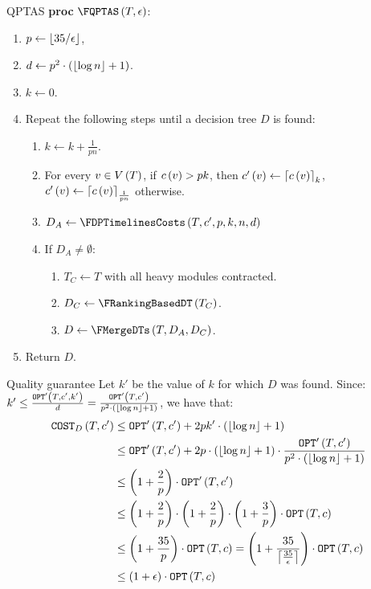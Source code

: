 \begin{frame}{QPTAS}
\textbf{proc} $\FQPTAS\br{T, \epsilon}$:
\begin{enumerate}
    \item $p\gets \left\lfloor 35/\epsilon \right\rfloor$, 
    \item $d\gets p^2\cdot\left( \left\lfloor \log n \right\rfloor+1 \right)$.
    \item $k\gets 0$.
    \item Repeat the following steps until a decision tree $D$ is found:
    \begin{enumerate}
        \item $k\gets k +\frac{1}{pn}$.
        \item For every $v\in V\left( T \right)$, if $c\left( v \right)>pk$, then $c'\left( v \right)\gets\left\lceil c\left( v \right) \right\rceil_k$, $c'\left( v \right)\gets\left\lceil c\left( v \right) \right\rceil_{\frac{1}{pn}}$ otherwise.
        \item $D_A\gets \FDPTimelinesCosts\br{T,c',p,k,n,d}$
        \item If $D_A\neq\emptyset$:
        \begin{enumerate}
            \item $T_C\gets T$ with all heavy modules contracted.
        \item $D_C\gets \FRankingBasedDT\br{T_C}$.
        \item $D\gets \FMergeDTs\br{T, D_A, D_C}$.
        \end{enumerate}
    \end{enumerate}
    \item Return $D$.
\end{enumerate}
\end{frame}
\begin{frame}{Quality guarantee}
Let $k'$ be the value of $k$ for which $D$ was found. Since: $k'\leq \frac{\texttt{OPT}'\left( T,c',k' \right)}{d}=\frac{\texttt{OPT}'\left( T,c' \right)}{p^2\cdot\left( \left\lfloor \log n \right\rfloor+1 \right)}$, we have that:
\begin{align*}
    \texttt{COST}_{D}\left( T,c' \right)&\leq \texttt{OPT}'\left( T,c' \right)+2pk'\cdot \left( \left\lfloor \log n \right\rfloor+1 \right)
    \\&\leq 
    \texttt{OPT}'\left( T,c' \right)+2p\cdot \left( \left\lfloor \log n \right\rfloor+1 \right)\cdot \frac{\texttt{OPT}'\left( T,c' \right)}{p^2\cdot\left( \left\lfloor \log n \right\rfloor+1 \right)} \\
    & \leq \left( 1+\frac{2}{p} \right)\cdot\texttt{OPT}'\left( T,c' \right) 
    \\&\leq 
    \left( 1+\frac{2}{p} \right)\cdot\left( 1+\frac{2}{p} \right)\cdot\left( 1+\frac{3}{p} \right)\cdot\texttt{OPT}\left( T,c \right)
    \\&
    \leq \left( 1+\frac{35}{p} \right)\cdot\texttt{OPT}\left( T,c \right) 
    = 
    \left( 1+\frac{35}{\left\lceil \frac{35}{\epsilon} \right\rceil} \right)\cdot\texttt{OPT}\left( T,c \right)
    \\&\leq 
    \left( 1+\epsilon \right)\cdot \texttt{OPT}\left( T,c \right)
\end{align*}
\end{frame}

